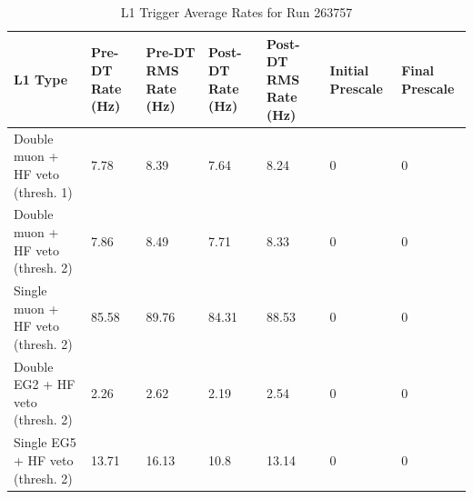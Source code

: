 \begin{table}[h!]
\centering
\caption{L1 Trigger Average Rates for Run 263757}
\label{my-label}
\begin{tabular}{@{}l|p{1.6cm}|p{1.6cm}|p{1.6cm}|p{1.6cm}|p{1.3cm}|p{1.3cm}|}
\toprule
L1 Type                           & Pre-DT Rate (Hz) & Pre-DT RMS Rate (Hz) & Post-DT Rate (Hz) & Post-DT RMS Rate (Hz) & Initial Prescale & Final Prescale \\ \midrule
Double muon + HF veto (thresh. 1) & 7.78             & 8.39                 & 7.64              & 8.24                  & 0                & 0              \\
Double muon + HF veto (thresh. 2) & 7.86             & 8.49                 & 7.71              & 8.33                  & 0                & 0              \\
Single muon + HF veto (thresh. 2) & 85.58            & 89.76                & 84.31             & 88.53                 & 0                & 0              \\
Double EG2 + HF veto (thresh. 2)  & 2.26             & 2.62                 & 2.19              & 2.54                  & 0                & 0              \\
Single EG5 + HF veto (thresh. 2)  & 13.71            & 16.13                & 10.8              & 13.14                 & 0                & 0              \\ \bottomrule
\end{tabular}
\end{table}

